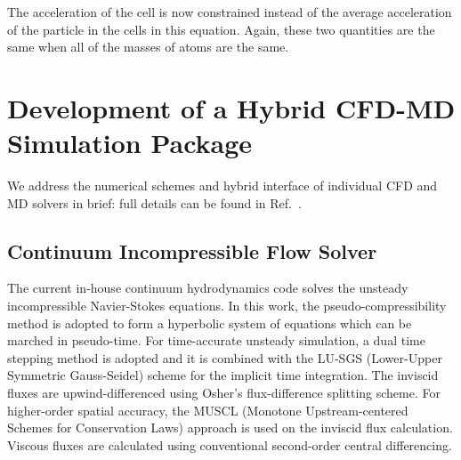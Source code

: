 \documentclass[]{aiaa-tc}%
\begin{document}
The acceleration of the cell is now constrained instead of the average acceleration of the particle in the cells in this equation.  Again, these two quantities are the same when all of the masses of atoms are the same. 













\section{Development of a Hybrid CFD-MD Simulation Package}
\label{sec:numerics}

We address the numerical schemes and hybrid interface of individual CFD and MD
solvers in brief: full details can be found in Ref.~.

\subsection{Continuum Incompressible Flow Solver}
\label{sec:numerics_cfd}

The current in-house continuum hydrodynamics code solves the unsteady 
incompressible Navier-Stokes equations. In this work, the pseudo-compressibility 
method\cite{PseudoCompressibility} is adopted to form a hyperbolic system of 
equations which can be marched in pseudo-time.
For time-accurate unsteady simulation, a dual time stepping method is adopted 
and it is combined with the LU-SGS (Lower-Upper Symmetric Gauss-Seidel) scheme
\cite{LU-SGS} for the implicit time integration. The inviscid fluxes are 
upwind-differenced using Osher's flux-difference splitting scheme\cite{Osher}. 
For higher-order spatial accuracy, the MUSCL (Monotone Upstream-centered 
Schemes for Conservation Laws)\cite{MUSCL} approach is used on the inviscid 
flux calculation. Viscous fluxes are calculated using conventional 
second-order central differencing.
\end{document}
